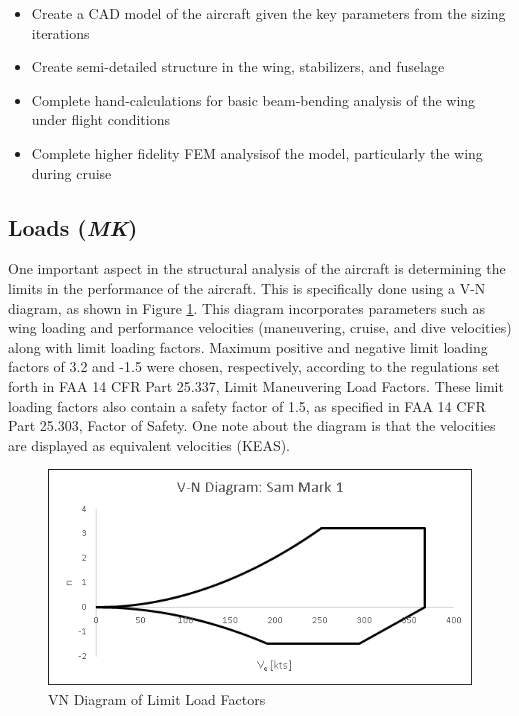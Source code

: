 \begin{itemize}
    \item Create a CAD model of the aircraft given the key parameters from the sizing iterations
    \item Create semi-detailed structure in the wing, stabilizers, and fuselage
    \item Complete hand-calculations for basic beam-bending analysis of the wing under flight conditions
    \item Complete higher fidelity FEM analysisof the model, particularly the wing during cruise
\end{itemize}


\subsection{Loads (\textit{MK})}

One important aspect in the structural analysis of the aircraft is determining the limits in the performance of the aircraft. This is specifically done using a V-N diagram, as shown in Figure \ref{figVN}. This diagram incorporates parameters such as wing loading and performance velocities (maneuvering, cruise, and dive velocities) along with limit loading factors. Maximum positive and negative limit loading factors of 3.2 and -1.5 were chosen, respectively, according to the regulations set forth in FAA 14 CFR Part 25.337, Limit Maneuvering Load Factors. These limit loading factors also contain a safety factor of 1.5, as specified in FAA 14 CFR Part 25.303, Factor of Safety. One note about the diagram is that the velocities are displayed as equivalent velocities (KEAS).

\begin{figure}[H]
    \centering
    \includegraphics{Photos/VN_Diagram_(2-11-20).png}
    \caption{VN Diagram of Limit Load Factors}
    \label{figVN}
\end{figure}




